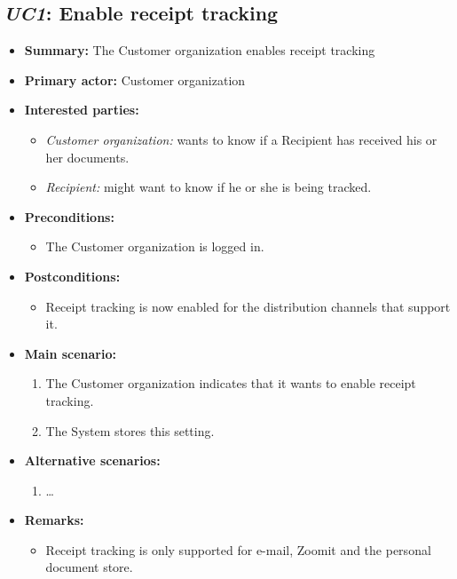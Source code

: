 \documentclass[a4paper,10pt]{article}
\begin{document}
\subsection{\emph{UC1}: Enable receipt tracking}
\begin{itemize}
	\item \textbf{Summary:} The Customer organization enables receipt tracking
    \item \textbf{Primary actor:} Customer organization
    \item \textbf{Interested parties:} 
        \begin{itemize}
            \item \textit{Customer organization:} wants to know if a Recipient has received his or her documents.
            \item \textit{Recipient:} might want to know if he or she is being tracked.
        \end{itemize}

    \item \textbf{Preconditions:}
        \begin{itemize}
            \item The Customer organization is logged in.
        \end{itemize}

    \item \textbf{Postconditions:}
        \begin{itemize}
            \item Receipt tracking is now enabled for the distribution channels that support it.
        \end{itemize}
        
    \item \textbf{Main scenario:} 
    \begin{enumerate}
       \item The Customer organization indicates that it wants to enable receipt tracking.
       \item The System stores this setting.
    \end{enumerate}

    \item \textbf{Alternative scenarios:} 
    \begin{enumerate}
        \item \ldots
    \end{enumerate}
    
    \item \textbf{Remarks:}
        \begin{itemize}
            \item Receipt tracking is only supported for e-mail, Zoomit and the personal document store.
        \end{itemize}
\end{itemize}
\end{document}
